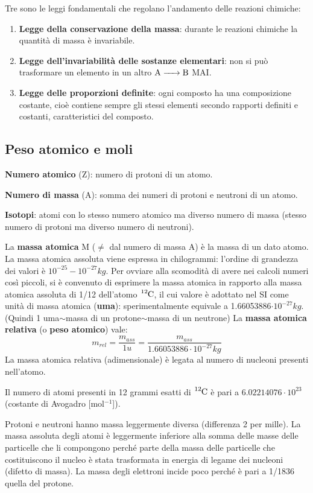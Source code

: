 Tre sono le leggi fondamentali che regolano l'andamento delle reazioni chimiche:

\begin{enumerate}
    \item \textbf{Legge della conservazione della massa}: durante le reazioni chimiche la quantità di massa è invariabile.
    \item \textbf{Legge dell'invariabilità delle sostanze elementari}: non si può trasformare un elemento in un altro \(\ce{ A -> B }\) MAI.
    \item \textbf{Legge delle proporzioni definite}: ogni composto ha una composizione costante, cioè contiene sempre gli stessi elementi secondo rapporti definiti e costanti, caratteristici del composto.
\end{enumerate}

\subsection{Peso atomico e moli}
\textbf{Numero atomico} (Z): numero di protoni di un atomo.

\textbf{Numero di massa} (A): somma dei numeri di protoni e neutroni di un
atomo.

\textbf{Isotopi}: atomi con lo stesso numero atomico ma diverso numero di
massa (stesso numero di protoni ma diverso numero di neutroni).

La \textbf{massa atomica} M ($\neq$ dal numero di massa A) è la massa di un dato atomo. La massa atomica assoluta viene espressa in chilogrammi: l'ordine di grandezza dei valori è $10^{-25}-10^{-27} kg$. Per ovviare alla scomodità di avere nei calcoli numeri così piccoli, si è convenuto di esprimere la
massa atomica in rapporto alla massa atomica assoluta di 1/12 dell'atomo \(\ce{ ^{12}C }\), il cui valore è adottato nel SI come unità di massa atomica (\textbf{uma}): sperimentalmente equivale a 1.66053886$\cdot
10^{-27} kg$. (Quindi 1 uma$\sim$massa di un protone$\sim$massa di un neutrone)
La \textbf{massa atomica relativa} (o \textbf{peso atomico}) vale:
$$m_{rel}=\frac{m_{ass}}{1 u}=\frac{m_{ass}}{1.66053886\cdot
10^{-27} kg}$$
La massa atomica relativa (adimensionale) è legata al numero di nucleoni presenti nell'atomo.

Il numero di atomi presenti in 12 grammi esatti di \(\ce{ ^{12}C }\) è pari a $6.02214076\cdot10^{23}$ (costante di Avogadro [mol$^{-1}$]).

Protoni e neutroni hanno massa leggermente diversa (differenza 2 per mille). La massa assoluta degli atomi è leggermente inferiore alla somma delle masse delle particelle che li compongono perché parte della massa delle particelle che costituiscono il nucleo è stata trasformata in energia di legame dei nucleoni (difetto di massa).
La massa degli elettroni incide poco perché è pari a 1/1836 quella del protone.

